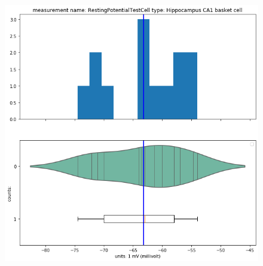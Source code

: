 \begin{figure}
  \centering
  \includegraphics[scale=0.45]{notebooks_converted/needata_thesis_files/needata_thesis_5_6}
  \label{fig:sub2}
\end{figure}

    
    

